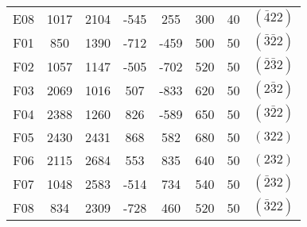 \begin{table}[H]
\begin{tabular}{c|c|c|c|c|c|c|c}
        E08 & 1017 & 2104 & -545 &  255 & 300 & 40 & $(\bar{4}22)$ \\
        F01 &  850 & 1390 & -712 & -459 & 500 & 50 & $(\bar{3}\bar{2}2)$ \\
        F02 & 1057 & 1147 & -505 & -702 & 520 & 50 & $(\bar{2}\bar{3}2)$ \\
        F03 & 2069 & 1016 &  507 & -833 & 620 & 50 & $(2\bar{3}2)$ \\
        F04 & 2388 & 1260 &  826 & -589 & 650 & 50 & $(3\bar{2}2)$ \\
        F05 & 2430 & 2431 &  868 &  582 & 680 & 50 & $(322)$ \\
        F06 & 2115 & 2684 &  553 &  835 & 640 & 50 & $(232)$ \\
        F07 & 1048 & 2583 & -514 &  734 & 540 & 50 & $(\bar{2}32)$ \\
        F08 &  834 & 2309 & -728 &  460 & 520 & 50 & $(\bar{3}22)$                
    \end{tabular}\label{tab:miller}
\end{table}